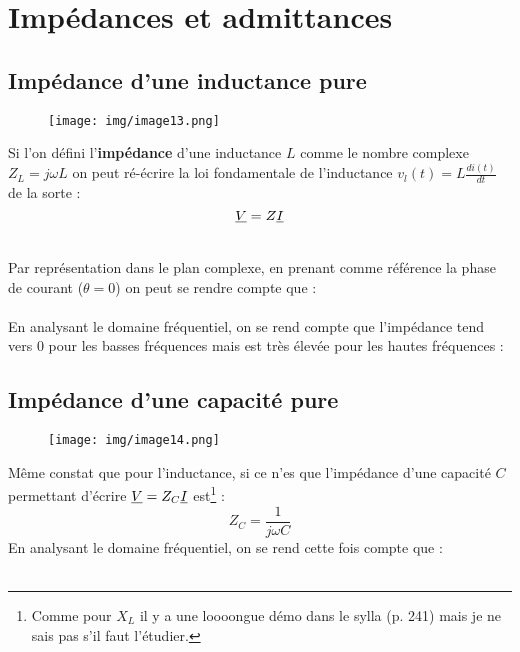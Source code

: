 \documentclass[british,french,11pt, a4paper, openany]{book}
\begin{document}
		\section{Impédances et admittances}
		\subsection{Impédance d'une inductance pure}
		\begin{wrapfigure}[10]{r}{3cm}
			\texttt{[image: img/image13.png]}
		\end{wrapfigure}
		Si l'on défini l'\textbf{impédance} d'une inductance $L$ comme le nombre complexe $Z_L = j\omega L$ on peut ré-écrire la loi fondamentale de l'inductance $v_l(t) = L\frac{di(t)}{dt}$ de la sorte : 
		\begin{equation}
		\underline{V} = Z\underline{I}
		\end{equation}
		
		\ \\
		
		Par représentation dans le plan complexe, en prenant comme référence la phase de courant ($\theta = 0$) on peut se rendre compte que :\\
		
		\ \\
		
		En analysant le domaine fréquentiel, on se rend compte que l'impédance tend vers 0 pour les basses fréquences mais est très élevée pour les hautes fréquences :\\
		
		
		\subsection{Impédance d'une capacité pure}
		\begin{wrapfigure}[7]{l}{3cm}
			\texttt{[image: img/image14.png]}
		\end{wrapfigure}
		Même constat que pour l'inductance, si ce n'es que l'impédance d'une capacité $C$ permettant d'écrire $\underline{V} = Z_C\underline{I}$ est\footnote{Comme pour $X_L$ il y a une loooongue démo dans le sylla (p. 241) mais je ne sais pas s'il faut l'étudier.} : 
		\begin{equation}
		Z_C = \frac{1}{j\omega C}
		\end{equation}
		En analysant le domaine fréquentiel, on se rend cette fois compte que :\\
		\ \\
		
\end{document}
